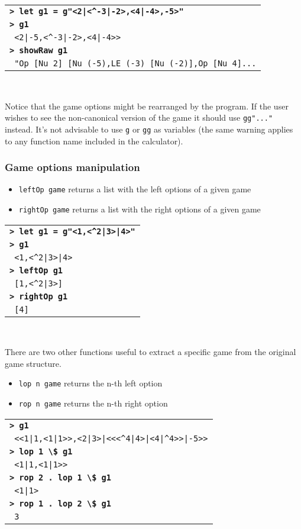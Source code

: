 \documentclass[a4paper,12pt]{article}
\newcommand{\bash}[1]{\small\textbf{\lstinline§> #1§}\\}
\newcommand{\out}[1]{\small\lstinline§ #1§}
\newcommand{\haskellCode}{\fontfamily{pcr}\selectfont}
\newenvironment{sgcode}
	{ \haskellCode
	  \begin{tabular}{|p{0.9\textwidth}|}
      \hline	
	}
	{ \\\hline  
      \end{tabular} \\
	  \par 
	}
\begin{document}
\begin{sgcode}
\bash{let g1 = g"<2|<^-3|-2>,<4|-4>,-5>"}
\bash{g1}
\out{<2|-5,<^-3|-2>,<4|-4>>} \\
\bash{showRaw g1}
\out{"Op [Nu 2] [Nu (-5),LE (-3) [Nu (-2)],Op [Nu 4]...}
\end{sgcode}

Notice that the game options might be rearranged by the program. If the user
wishes to see the non-canonical version of the game it should use \verb|gg"..."|
instead. It's not advisable to use \verb|g| or \verb|gg| as variables (the same
warning applies to any function name included in the calculator).

\subsubsection{Game options manipulation}

\begin{itemize} \setlength\itemsep{0.1em}
  \item \verb|leftOp game| returns a list with the left options of a given game
  \item \verb|rightOp game| returns a list with the right options of a given game
\end{itemize}

\begin{sgcode}
\bash{let g1 = g"<1,<^2|3>|4>"}
\bash{g1}
\out{<1,<^2|3>|4>}\\
\bash{leftOp g1}
\out{[1,<^2|3>]} \\
\bash{rightOp g1}
\out{[4]}
\end{sgcode}

There are two other functions useful to extract a specific game from the original game structure.

\begin{itemize} \setlength\itemsep{0.1em}
  \item \verb|lop n game| returns the n-th left option
  \item \verb|rop n game| returns the n-th right option
\end{itemize}

\begin{sgcode}
\bash{g1}
\out{<<1|1,<1|1>>,<2|3>|<<<^4|4>|<4|^4>>|-5>>}\\
\bash{lop 1 \$ g1}
\out{<1|1,<1|1>>} \\
\bash{rop 2 . lop 1 \$ g1}
\out{<1|1>} \\
\bash{rop 1 . lop 2 \$ g1}
\out{3}
\end{sgcode}
\end{document}
